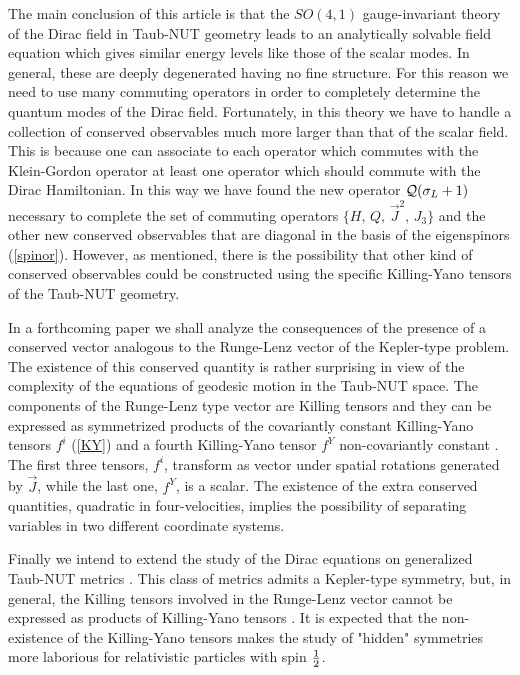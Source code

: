 \documentclass[a4paper,12pt]{article}
\begin{document}
The main conclusion of this article is that the $SO(4,1)$ gauge-invariant 
theory of the Dirac field in Taub-NUT geometry leads to an analytically 
solvable field equation which gives similar energy levels like those of the 
scalar modes. In general, these are deeply degenerated having no fine structure. 
For this reason we need to use many commuting operators in order to completely 
determine the quantum modes of the Dirac field. Fortunately, in this theory we 
have to handle a collection of conserved observables much more larger than that 
of the scalar field. This is because one can associate to each operator which 
commutes with the Klein-Gordon operator at least one operator which should 
commute with the Dirac Hamiltonian. In this way we have found the new operator 
${\cal Q}(\sigma_{L}+1)$ necessary to complete the  set of commuting operators  
$\{H,\,Q,\,{\vec{J}}^{2},\,J_{3}\}$  and the other new conserved observables 
that are diagonal in the basis of the eigenspinors (\ref{spinor}). However, as 
mentioned, there is the possibility that  other kind of conserved observables 
could be constructed using the specific Killing-Yano tensors of the Taub-NUT 
geometry.      

In a forthcoming paper \cite{CV1} we shall analyze the consequences of the
presence of a conserved vector analogous to the Runge-Lenz vector of the
Kepler-type problem. The existence of this conserved quantity is rather
surprising in view of the complexity of the equations of geodesic motion
in the Taub-NUT space. The components of the Runge-Lenz type vector are
Killing tensors and they can be expressed as symmetrized products of the
covariantly constant Killing-Yano tensors $f^i$ (\ref{KY}) and a fourth
Killing-Yano tensor $f^Y$ non-covariantly constant \cite{GR,G3}. The first 
three tensors, $f^i$, transform as vector under spatial rotations generated by 
${\vec J}$, while the last one, $f^Y$, is a scalar. The existence of the
extra conserved quantities, quadratic in four-velocities, implies the
possibility of separating variables in two different coordinate systems.

Finally we intend to extend the study of the Dirac equations on
generalized Taub-NUT metrics \cite{IWK}. This class
of metrics admits a Kepler-type symmetry, but, in general, the Killing
tensors involved in the Runge-Lenz vector cannot be expressed as products
of Killing-Yano tensors \cite{MV}.
It is expected that the non-existence of the Killing-Yano
tensors makes the study of "hidden" symmetries more laborious for
relativistic particles with spin ${1\over 2}$.
\end{document}
